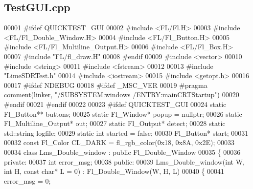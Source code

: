 \subsection{Test\+G\+U\+I.\+cpp}
\label{TestGUI_8cpp_source}

\begin{DoxyCode}
00001 \textcolor{preprocessor}{#ifdef QUICKTEST\_GUI}
00002 \textcolor{preprocessor}{#include <FL/Fl.H>}
00003 \textcolor{preprocessor}{#include <FL/Fl\_Double\_Window.H>}
00004 \textcolor{preprocessor}{#include <FL/Fl\_Button.H>}
00005 \textcolor{preprocessor}{#include <FL/Fl\_Multiline\_Output.H>}
00006 \textcolor{preprocessor}{#include <FL/Fl\_Box.H>}
00007 \textcolor{preprocessor}{#include "FL/fl\_draw.H"}
00008 \textcolor{preprocessor}{#endif}
00009 \textcolor{preprocessor}{#include <vector>}
00010 \textcolor{preprocessor}{#include <string>}
00011 \textcolor{preprocessor}{#include <fstream>}
00012 
00013 \textcolor{preprocessor}{#include "LimeSDRTest.h"}
00014 \textcolor{preprocessor}{#include <iostream>}
00015 \textcolor{preprocessor}{#include <getopt.h>}
00016 
00017 \textcolor{preprocessor}{#ifdef NDEBUG}
00018 \textcolor{preprocessor}{#ifdef \_MSC\_VER}
00019 \textcolor{preprocessor}{#pragma comment(linker, "/SUBSYSTEM:windows /ENTRY:mainCRTStartup")}
00020 \textcolor{preprocessor}{#endif}
00021 \textcolor{preprocessor}{#endif}
00022 
00023 \textcolor{preprocessor}{#ifdef QUICKTEST\_GUI}
00024 \textcolor{keyword}{static} Fl\_Button** buttons;
00025 \textcolor{keyword}{static} Fl\_Window* popup = \textcolor{keyword}{nullptr};
00026 \textcolor{keyword}{static} Fl\_Multiline\_Output* out;
00027 \textcolor{keyword}{static} Fl\_Output* detect;
00028 \textcolor{keyword}{static} std::string logfile;
00029 \textcolor{keyword}{static} \textcolor{keywordtype}{int} started = \textcolor{keyword}{false};
00030 Fl\_Button* start;
00031 
00032 \textcolor{keyword}{const} Fl\_Color CL\_DARK = fl\_rgb\_color(0x18, 0x8A, 0x2E);
00033 
00034 \textcolor{keyword}{class }Lms\_Double\_window : \textcolor{keyword}{public} Fl\_Double\_Window
00035 \{
00036 \textcolor{keyword}{private}:
00037     \textcolor{keywordtype}{int} error\_msg;
00038 \textcolor{keyword}{public}:
00039     Lms\_Double\_window(\textcolor{keywordtype}{int} W, \textcolor{keywordtype}{int} H, \textcolor{keyword}{const} \textcolor{keywordtype}{char}* L = 0) : Fl\_Double\_Window(W, H, 
      L)
00040     \{
00041         error\_msg = 0;

\end{DoxyCode}
